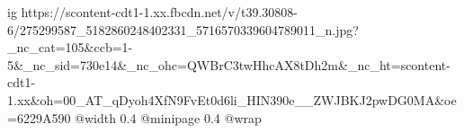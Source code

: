  
 
 
 
 

\ifcmt
  ig https://scontent-cdt1-1.xx.fbcdn.net/v/t39.30808-6/275299587_5182860248402331_5716570339604789011_n.jpg?_nc_cat=105&ccb=1-5&_nc_sid=730e14&_nc_ohc=QWBrC3twHhcAX8tDh2m&_nc_ht=scontent-cdt1-1.xx&oh=00_AT_qDyoh4XfN9FvEt0d6li_HIN390e__ZWJBKJ2pwDG0MA&oe=6229A590
  @width 0.4
  @minipage 0.4
  @wrap \parpic[r]
\fi
